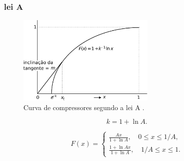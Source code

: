 \begin{frame}[allowframebreaks]
  \frametitle{lei A}

  \begin{figure}[h!]
  \centering
  \includegraphics[width=0.6\textwidth]{images/Alaw.pdf}
  \caption{Curva de compressores segundo a lei A \citep{tokunbo}.}
  \label{fig:Alaw}
  \end{figure}

  \begin{equation}
  k = 1 + \ln A .
  \end{equation}

  \begin{equation}
  F(x) = \begin{cases}
  \frac{Ax}{1+\ln A} , \quad 0 \leq x \leq 1/A , \\
  \frac{1+\ln Ax}{1+\ln A}, \quad 1/A \leq x \leq 1 .
  \end{cases}
  \end{equation}

\end{frame}

